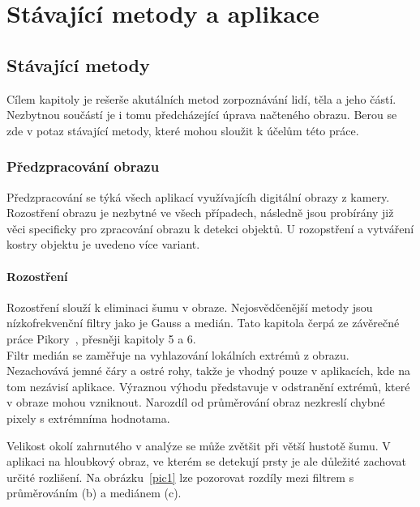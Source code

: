 
\textit{}\chapter{Stávající metody a aplikace}

\section{Stávající metody}
Cílem kapitoly je rešerše akutálních metod zorpoznávání lidí, těla a jeho částí. Nezbytnou součástí je i tomu předcházející úprava načteného obrazu. Berou se zde v potaz stávající metody, které mohou sloužit k účelům této práce.

\subsection{Předzpracování obrazu}
Předzpracování se týká všech aplikací využívajícíh digitální obrazy z kamery. Rozostření obrazu je nezbytné ve všech případech, následně jsou probírány již věci specificky pro zpracování obrazu k detekci objektů. U rozopstření a vytváření kostry objektu je uvedeno více variant.

\subsubsection{Rozostření}
Rozostření slouží k eliminaci šumu v obraze. Nejosvědčenější metody jsou nízkofrekvenční filtry jako je Gauss a medián. Tato kapitola čerpá ze závěrečné práce Pikory~\cite{15}, přesněji kapitoly 5 a 6.\\

Filtr medián se zaměřuje na vyhlazování lokálních extrémů z obrazu. Nezachovává jemné čáry a ostré rohy, takže je vhodný pouze v aplikacích, kde na tom nezávisí aplikace. Výraznou výhodu představuje v odstranění extrémů, které v obraze mohou vzniknout. Narozdíl od průměrování obraz nezkreslí chybné pixely s extrémníma hodnotama. %
 
Velikost okolí zahrnutého v analýze se může zvětšit při větší hustotě šumu. V aplikaci na hloubkový obraz, ve kterém se detekují prsty je ale důležité zachovat určité rozlišení. Na obrázku~\ref{pic1} lze pozorovat rozdíly mezi filtrem s průměrováním (b) a mediánem (c).\\


